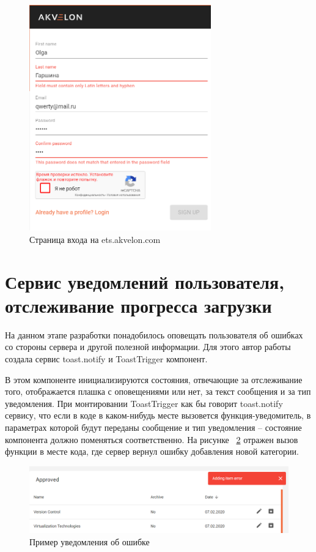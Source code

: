 \documentclass[14pt, a4paper]{diplom}
\begin{document}
\begin{figure}[!ht]
\centering
\includegraphics[width=0.7\textwidth]{resources/signup.png}
\caption{Страница входа на ets.akvelon.com}
\label{fig:1}
\end{figure}

\section{Сервис уведомлений пользователя, отслеживание прогресса загрузки}

На данном этапе разработки понадобилось оповещать пользователя об ошибках со стороны сервера и другой полезной информации.
Для этого автор работы создала сервис toast.notify и ToastTrigger компонент.

В этом компоненте инициализируются состояния, отвечающие за отслеживание того, отображается плашка с оповещениями или нет, за текст сообщения и за тип уведомления.
При монтировании ToastTrigger как бы говорит toast.notify сервису, что если в коде в каком-нибудь месте вызовется функция-уведомитель, в параметрах которой будут переданы сообщение и тип уведомления -- состояние
компонента должно поменяться соответственно. На рисунке ~\ref{4} отражен вызов функции в месте кода, где сервер вернул ошибку добавления новой категории.

\begin{figure}[!ht]
\centering
\includegraphics[width=1\textwidth]{resources/toasterror.png}
\caption{Пример уведомления об ошибке}
\label{4}
\end{figure}
\end{document}
